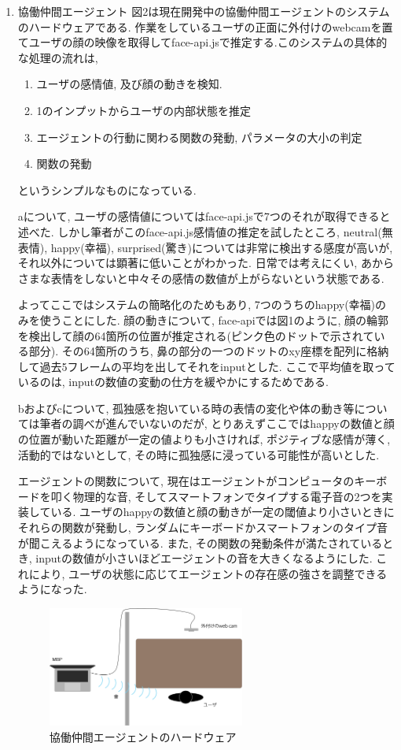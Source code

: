 \documentclass[a4paper,dvipdfmx]{hisken}
\begin{document}
\begin{enumerate}
\item 協働仲間エージェント
図2は現在開発中の協働仲間エージェントのシステムのハードウェアである. 作業をしているユーザの正面に外付けのwebcamを置てユーザの顔の映像を取得してface-api.jsで推定する.このシステムの具体的な処理の流れは, 

\begin{enumerate}
\item ユーザの感情値, 及び顔の動きを検知.
\item 1のインプットからユーザの内部状態を推定
\item エージェントの行動に関わる関数の発動, パラメータの大小の判定
\item 関数の発動
\end{enumerate}
というシンプルなものになっている. 

aについて, ユーザの感情値についてはface-api.jsで7つのそれが取得できると述べた. しかし筆者がこのface-api.js感情値の推定を試したところ, neutral(無表情), happy(幸福), surprised(驚き)については非常に検出する感度が高いが, それ以外については顕著に低いことがわかった. 日常では考えにくい, あからさまな表情をしないと中々その感情の数値が上がらないという状態である. 

よってここではシステムの簡略化のためもあり, 7つのうちのhappy(幸福)のみを使うことにした. 顔の動きについて, face-apiでは図1のように, 顔の輪郭を検出して顔の64箇所の位置が推定される(ピンク色のドットで示されている部分). その64箇所のうち, 鼻の部分の一つのドットのxy座標を配列に格納して過去5フレームの平均を出してそれをinputとした. ここで平均値を取っているのは, inputの数値の変動の仕方を緩やかにするためである.

bおよびcについて, 孤独感を抱いている時の表情の変化や体の動き等については筆者の調べが進んでいないのだが, とりあえずここではhappyの数値と顔の位置が動いた距離が一定の値よりも小さければ, ポジティブな感情が薄く, 活動的ではないとして, その時に孤独感に浸っている可能性が高いとした. 

エージェントの関数について, 現在はエージェントがコンピュータのキーボードを叩く物理的な音, そしてスマートフォンでタイプする電子音の2つを実装している.  ユーザのhappyの数値と顔の動きが一定の閾値より小さいときにそれらの関数が発動し, ランダムにキーボードかスマートフォンのタイプ音が聞こえるようになっている. また, その関数の発動条件が満たされているとき, inputの数値が小さいほどエージェントの音を大きくなるようにした. これにより, ユーザの状態に応じてエージェントの存在感の強さを調整できるようになった.

\begin{figure}
  \includegraphics[width=65mm]{StrangerAgent_hardware.png}
  \caption{協働仲間エージェントのハードウェア}
  \label{fig:detection}
\end{figure}





\end{enumerate}
\end{document}
